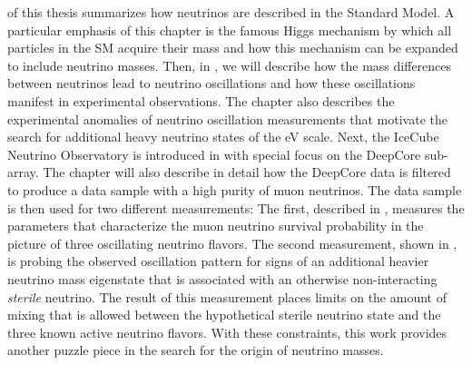  of this thesis summarizes how neutrinos are described in the Standard Model. A particular emphasis of this chapter is the famous Higgs mechanism by which all particles in the SM acquire their mass and how this mechanism can be expanded to include neutrino masses. Then, in , we will describe how the mass differences between neutrinos lead to neutrino oscillations and how these oscillations manifest in experimental observations. The chapter also describes the experimental anomalies of neutrino oscillation measurements that motivate the search for additional heavy neutrino states of the eV scale. Next, the IceCube Neutrino Observatory is introduced in  with special focus on the DeepCore sub-array. The chapter will also describe in detail how the DeepCore data is filtered to produce a data sample with a high purity of muon neutrinos. The data sample is then used for two different measurements: The first, described in , measures the parameters that characterize the muon neutrino survival probability in the picture of three oscillating neutrino flavors. The second measurement, shown in , is probing the observed oscillation pattern for signs of an additional heavier neutrino mass eigenstate that is associated with an otherwise non-interacting \emph{sterile} neutrino. The result of this measurement places limits on the amount of mixing that is allowed between the hypothetical sterile neutrino state and the three known active neutrino flavors. With these constraints, this work provides another puzzle piece in the search for the origin of neutrino masses.

